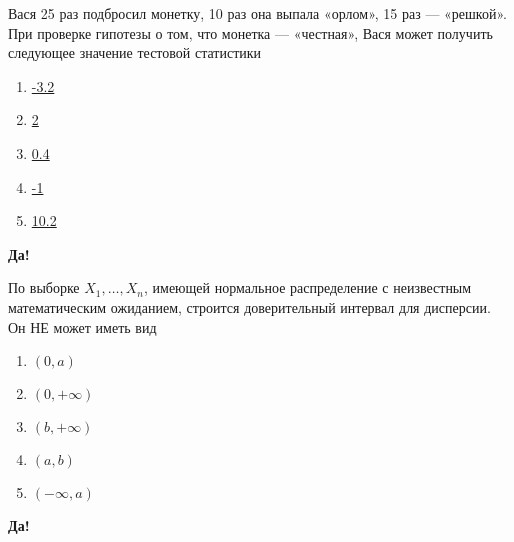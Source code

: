 \documentclass[t]{beamer}
\begin{document}
 \begin{frame} \label{39-Yes} 
\begin{block}{39} 

Вася 25 раз подбросил монетку, 10 раз она выпала «орлом», 15 раз — «решкой».
При проверке гипотезы о том, что монетка — «честная»,
Вася может получить следующее значение тестовой статистики


 \end{block} 
\begin{enumerate} 
\item[] \hyperlink{39-No}{\beamergotobutton{} -3.2}
\item[] \hyperlink{39-No}{\beamergotobutton{} 2}
\item[] \hyperlink{39-No}{\beamergotobutton{} 0.4}
\item[] \hyperlink{39-Yes}{\beamergotobutton{} -1}
\item[] \hyperlink{39-No}{\beamergotobutton{} 10.2}
\end{enumerate} 

 \textbf{Да!} 
 \hyperlink{40}{}\end{frame} 


 \begin{frame} \label{40-Yes} 
\begin{block}{40} 

По выборке $X_1,\ldots,X_{n}$, имеющей нормальное распределение с неизвестным математическим ожиданием, строится доверительный интервал для дисперсии. Он НЕ может иметь вид


 \end{block} 
\begin{enumerate} 
\item[] \hyperlink{40-No}{\beamergotobutton{} $(0, a)$}
\item[] \hyperlink{40-No}{\beamergotobutton{} $(0, +\infty)$}
\item[] \hyperlink{40-No}{\beamergotobutton{} $(b, +\infty)$}
\item[] \hyperlink{40-No}{\beamergotobutton{} $(a, b)$}
\item[] \hyperlink{40-Yes}{\beamergotobutton{} $(-\infty, a)$}
\end{enumerate} 

 \textbf{Да!} 
 \hyperlink{41}{}\end{frame} 
\end{document}
